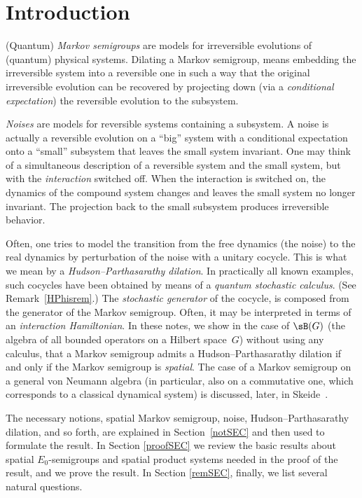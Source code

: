 \section{Introduction}

(Quantum) {\it Markov semigroups} are models for irreversible evolutions of (quantum) physical systems. Dilating a Markov semigroup, means embedding the irreversible system into a reversible one in such a way that the original irreversible evolution can be recovered by projecting down (via a {\it conditional expectation}) the reversible evolution to the subsystem.

{\it Noises} are models for reversible systems containing a subsystem. A noise is actually a reversible evolution on a ``big'' system with a conditional expectation onto a ``small'' subsystem that leaves the small system invariant. One may think of a simultaneous description of a reversible system and the small system, but with the {\it interaction} switched off. When the interaction is switched on, the dynamics of the compound system changes and leaves the small system no longer invariant. The projection back to the small subsystem produces irreversible behavior.

Often, one tries to model the transition from the free dynamics (the noise) to the real dynamics by perturbation of the noise with a unitary cocycle. This is what we mean by a {\it Hudson--Parthasarathy dilation}. In practically all known examples, such cocycles have been obtained by means of a {\it quantum stochastic calculus}. (See Remark~\ref{HPhisrem}.) The {\it stochastic generator} of the cocycle, is composed from the generator of the Markov semigroup. Often, it may be interpreted in terms of an {\it interaction Hamiltonian}. In these notes, we show in the case of $\sB(G)$ (the algebra of all bounded operators on a Hilbert space~$G$) without using any calculus, that a Markov semigroup admits a Hudson--Parthasarathy dilation if and only if the Markov semigroup is {\it spatial}. The case of a Markov semigroup on a general von Neumann algebra (in particular, also on a commutative one, which corresponds to a classical dynamical system) is discussed, later, in Skeide~\cite{Ske16}.

The necessary notions, spatial Markov semigroup, noise, Hudson--Parthasarathy dilation, and so forth, are explained in Section~\ref{notSEC} and then used to formulate the result. In Section \ref{proofSEC} we review the basic results about spatial $E_0$-semigroups and spatial product systems needed in the proof of the result, and we prove the result. In Section \ref{remSEC}, finally, we list several natural questions.

